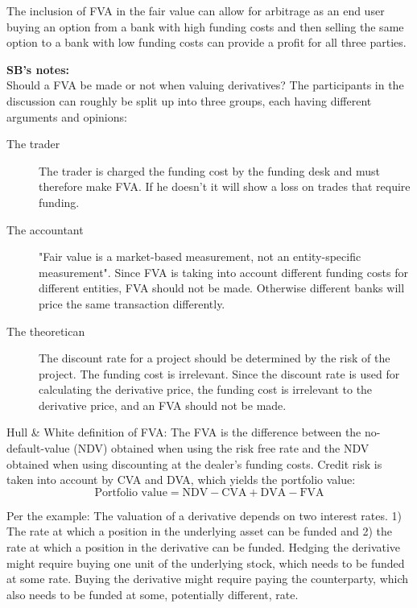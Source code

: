 \documentclass[10pt,a4paper]{article}
\begin{document}
        The inclusion of FVA in the fair value can allow for arbitrage as an end user buying an option from a bank with high funding costs and then selling the same option to a bank with low funding costs can provide a profit for all three parties.

        \textbf{SB's notes:} \\
        Should a FVA be made or not when valuing derivatives? The participants in the discussion can roughly be split up into three groups, each having different arguments and opinions:

        \begin{description}
            \item[The trader] The trader is charged the funding cost by the funding desk and must therefore make FVA. If he doesn't it will show a loss on trades that require funding.
            
            \item[The accountant] "Fair value is a market-based measurement, not an entity-specific measurement". Since FVA is taking into account different funding costs for different entities, FVA should not be made. Otherwise different banks will price the same transaction differently.
            
            \item[The theoretican] The discount rate for a project should be determined by the risk of the project. The funding cost is irrelevant. Since the discount rate is used for calculating the derivative price, the funding cost is irrelevant to the derivative price, and an FVA should not be made.
        \end{description}

            Hull \& White definition of FVA: The FVA is the difference between the no-default-value (NDV) obtained when using the risk free rate and the NDV obtained when using discounting at the dealer's funding costs. Credit risk is taken into account by CVA and DVA, which yields the portfolio value:
            \begin{equation}
                \text{Portfolio value} = \text{NDV} - \text{CVA} + \text{DVA} - \text{FVA}
            \end{equation}

            Per the example: The valuation of a derivative depends on two interest rates. 1) The rate at which a position in the underlying asset can be funded and 2) the rate at which a position in the derivative can be funded. Hedging the derivative might require buying one unit of the underlying stock, which needs to be funded at some rate. Buying the derivative might require paying the counterparty, which also needs to be funded at some, potentially different, rate.
            
\end{document}
